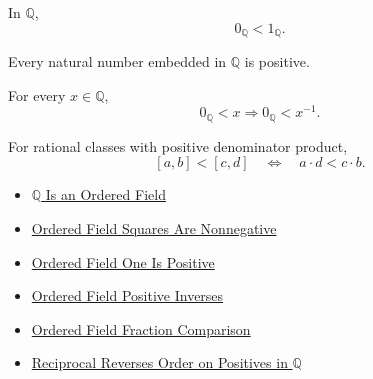 \begin{corollary}
\label{cor:one-positive-on-q}
In $\mathbb{Q}$,
\[
0_{\mathbb{Q}}<1_{\mathbb{Q}}.
\]
\end{corollary}

\begin{corollary}
\label{cor:natural-numbers-positive-on-q}
Every natural number embedded in $\mathbb{Q}$ is positive.
\end{corollary}

\begin{corollary}
\label{cor:positive-rationals-have-positive-inverses}
For every $x\in\mathbb{Q}$,
\[
0_{\mathbb{Q}}<x
\Longrightarrow
0_{\mathbb{Q}}<x^{-1}.
\]
\end{corollary}

\begin{corollary}
\label{cor:fraction-comparison-on-q}
For rational classes with positive denominator product,
\[
[a,b]<[c,d]
\quad\Longleftrightarrow\quad
a\cdot d<c\cdot b.
\]
\end{corollary}

\begin{dependencies}
\begin{itemize}
  \item \hyperref[thm:q-is-an-ordered-field]{$\mathbb{Q}$ Is an Ordered Field}
  \item \hyperref[thm:ordered-field-squares-nonnegative]{Ordered Field Squares Are Nonnegative}
  \item \hyperref[thm:ordered-field-one-positive]{Ordered Field One Is Positive}
  \item \hyperref[thm:ordered-field-positive-inverses]{Ordered Field Positive Inverses}
  \item \hyperref[thm:ordered-field-fraction-comparison]{Ordered Field Fraction Comparison}
  \item \hyperref[thm:reciprocal-reverses-order-on-positives-q]{Reciprocal Reverses Order on Positives in $\mathbb{Q}$}
\end{itemize}
\end{dependencies}
